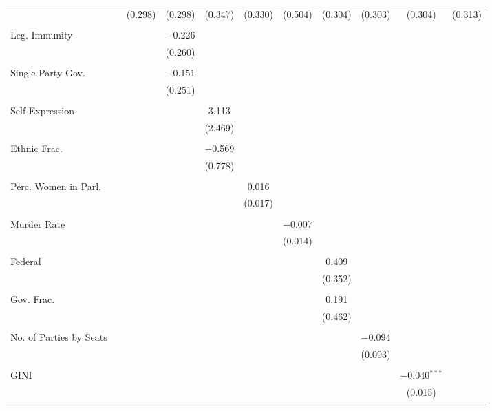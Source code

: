 \documentclass[a4paper]{article}\usepackage[]{graphicx}\usepackage[]{color}
\begin{document}
\begin{table}
\begin{center}
{{\begin{tabular}{@{\extracolsep{5pt}}lcccccccccc}
  &  & (0.298) & (0.298) & (0.347) & (0.330) & (0.504) & (0.304) & (0.303) & (0.304) & (0.313) \\ 
  & & & & & & & & & & \\ 
 Leg. Immunity &  &  & $-$0.226 &  &  &  &  &  &  &  \\ 
  &  &  & (0.260) &  &  &  &  &  &  &  \\ 
  & & & & & & & & & & \\ 
 Single Party Gov. &  &  & $-$0.151 &  &  &  &  &  &  &  \\ 
  &  &  & (0.251) &  &  &  &  &  &  &  \\ 
  & & & & & & & & & & \\ 
 Self Expression &  &  &  & 3.113 &  &  &  &  &  &  \\ 
  &  &  &  & (2.469) &  &  &  &  &  &  \\ 
  & & & & & & & & & & \\ 
 Ethnic Frac. &  &  &  & $-$0.569 &  &  &  &  &  &  \\ 
  &  &  &  & (0.778) &  &  &  &  &  &  \\ 
  & & & & & & & & & & \\ 
 Perc. Women in Parl. &  &  &  &  & 0.016 &  &  &  &  &  \\ 
  &  &  &  &  & (0.017) &  &  &  &  &  \\ 
  & & & & & & & & & & \\ 
 Murder Rate &  &  &  &  &  & $-$0.007 &  &  &  &  \\ 
  &  &  &  &  &  & (0.014) &  &  &  &  \\ 
  & & & & & & & & & & \\ 
 Federal &  &  &  &  &  &  & 0.409 &  &  &  \\ 
  &  &  &  &  &  &  & (0.352) &  &  &  \\ 
  & & & & & & & & & & \\ 
 Gov. Frac. &  &  &  &  &  &  & 0.191 &  &  &  \\ 
  &  &  &  &  &  &  & (0.462) &  &  &  \\ 
  & & & & & & & & & & \\ 
 No. of Parties by Seats &  &  &  &  &  &  &  & $-$0.094 &  &  \\ 
  &  &  &  &  &  &  &  & (0.093) &  &  \\ 
  & & & & & & & & & & \\ 
 GINI &  &  &  &  &  &  &  &  & $-$0.040$^{***}$ &  \\ 
  &  &  &  &  &  &  &  &  & (0.015) &  \\ 
  & & & & & & & & & & \\ 

\end{tabular}}}
\end{center}
\end{table}
\end{document}
